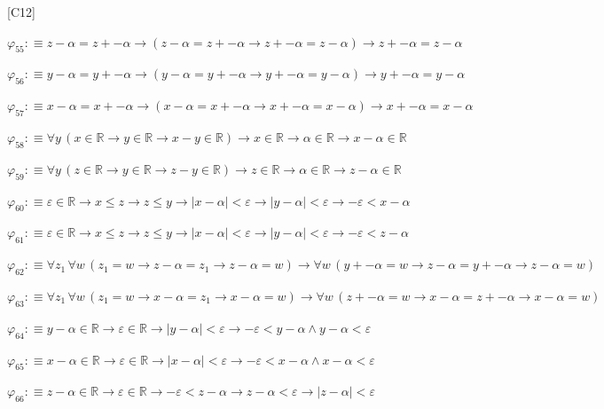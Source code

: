 \begin{fullproof}{[C12]}
\begin{abbrevlist}
\item $\varphi_{55} :\equiv z - \alpha = z + -\alpha \to (z - \alpha = z + -\alpha \to z + -\alpha = z - \alpha) \to z + -\alpha = z - \alpha$
\item $\varphi_{56} :\equiv y - \alpha = y + -\alpha \to (y - \alpha = y + -\alpha \to y + -\alpha = y - \alpha) \to y + -\alpha = y - \alpha$
\item $\varphi_{57} :\equiv x - \alpha = x + -\alpha \to (x - \alpha = x + -\alpha \to x + -\alpha = x - \alpha) \to x + -\alpha = x - \alpha$
\item $\varphi_{58} :\equiv \forall y\,(x \in \mathbb{R} \to y \in \mathbb{R} \to x - y \in \mathbb{R}) \to x \in \mathbb{R} \to \alpha \in \mathbb{R} \to x - \alpha \in \mathbb{R}$
\item $\varphi_{59} :\equiv \forall y\,(z \in \mathbb{R} \to y \in \mathbb{R} \to z - y \in \mathbb{R}) \to z \in \mathbb{R} \to \alpha \in \mathbb{R} \to z - \alpha \in \mathbb{R}$
\item $\varphi_{60} :\equiv \varepsilon \in \mathbb{R} \to x \leq z \to z \leq y \to \lvert x - \alpha \rvert < \varepsilon \to \lvert y - \alpha \rvert < \varepsilon \to -\varepsilon < x - \alpha$
\item $\varphi_{61} :\equiv \varepsilon \in \mathbb{R} \to x \leq z \to z \leq y \to \lvert x - \alpha \rvert < \varepsilon \to \lvert y - \alpha \rvert < \varepsilon \to -\varepsilon < z - \alpha$
\item $\varphi_{62} :\equiv \forall z_{1}\,\forall w\,(z_{1} = w \to z - \alpha = z_{1} \to z - \alpha = w) \to \forall w\,(y + -\alpha = w \to z - \alpha = y + -\alpha \to z - \alpha = w)$
\item $\varphi_{63} :\equiv \forall z_{1}\,\forall w\,(z_{1} = w \to x - \alpha = z_{1} \to x - \alpha = w) \to \forall w\,(z + -\alpha = w \to x - \alpha = z + -\alpha \to x - \alpha = w)$
\item $\varphi_{64} :\equiv y - \alpha \in \mathbb{R} \to \varepsilon \in \mathbb{R} \to \lvert y - \alpha \rvert < \varepsilon \to -\varepsilon < y - \alpha \land y - \alpha < \varepsilon$
\item $\varphi_{65} :\equiv x - \alpha \in \mathbb{R} \to \varepsilon \in \mathbb{R} \to \lvert x - \alpha \rvert < \varepsilon \to -\varepsilon < x - \alpha \land x - \alpha < \varepsilon$
\item $\varphi_{66} :\equiv z - \alpha \in \mathbb{R} \to \varepsilon \in \mathbb{R} \to -\varepsilon < z - \alpha \to z - \alpha < \varepsilon \to \lvert z - \alpha \rvert < \varepsilon$

\end{abbrevlist}
\end{fullproof}
